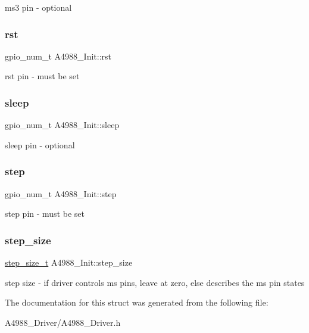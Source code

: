 ms3 pin -\/ optional \mbox{\label{structA4988__Init_ae2219a7fac36bf82c31eedc4782274eb}} 
\subsubsection{\texorpdfstring{rst}{rst}}
{\footnotesize\ttfamily gpio\+\_\+num\+\_\+t A4988\+\_\+\+Init\+::rst}

rst pin -\/ must be set \mbox{\label{structA4988__Init_ae4c5d92364b12c390642e9118b55d4b5}} 
\subsubsection{\texorpdfstring{sleep}{sleep}}
{\footnotesize\ttfamily gpio\+\_\+num\+\_\+t A4988\+\_\+\+Init\+::sleep}

sleep pin -\/ optional \mbox{\label{structA4988__Init_a80c66f6a33ad5eaa8687cb158c158c95}} 
\subsubsection{\texorpdfstring{step}{step}}
{\footnotesize\ttfamily gpio\+\_\+num\+\_\+t A4988\+\_\+\+Init\+::step}

step pin -\/ must be set \mbox{\label{structA4988__Init_a4e0ca5ac2bb809dc60dab333c6d6142f}} 
\subsubsection{\texorpdfstring{step\+\_\+size}{step\_size}}
{\footnotesize\ttfamily \hyperlink{group__A4988__definitions_gad84fc402211d9487e63ee884e4d79531}{step\+\_\+size\+\_\+t} A4988\+\_\+\+Init\+::step\+\_\+size}

step size -\/ if driver controls ms pins, leave at zero, else describes the ms pin states 

The documentation for this struct was generated from the following file\+:\begin{DoxyCompactItemize}
\item 
A4988\+\_\+\+Driver/A4988\+\_\+\+Driver.\+h\end{DoxyCompactItemize}
